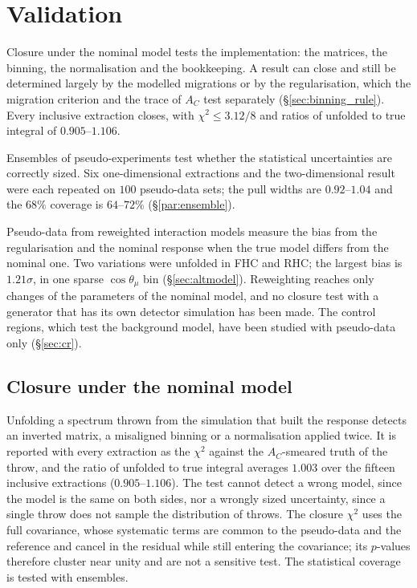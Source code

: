 \documentclass[11pt,a4paper]{article}
\begin{document}
\section{Validation}
\label{sec:validation}

Closure under the nominal model tests the implementation: the matrices, the binning, the
normalisation and the bookkeeping. A result can close and still be determined largely by the modelled
migrations or by the regularisation, which the migration criterion and the trace of $A_C$ test
separately (\S\ref{sec:binning_rule}). Every inclusive extraction closes, with $\chi^2\le3.12/8$ and
ratios of unfolded to true integral of $0.905$--$1.106$.

Ensembles of pseudo-experiments test whether the statistical uncertainties are correctly sized. Six
one-dimensional extractions and the two-dimensional result were each repeated on $100$ pseudo-data sets;
the pull widths are $0.92$--$1.04$ and the $68\%$ coverage is $64$--$72\%$ (\S\ref{par:ensemble}).

Pseudo-data from reweighted interaction models measure the bias from the regularisation and the nominal
response when the true model differs from the nominal one. Two variations were unfolded in FHC and
RHC; the largest bias is $1.21\sigma$, in one sparse $\cos\theta_\mu$ bin (\S\ref{sec:altmodel}).
Reweighting reaches only changes of the parameters of the nominal model, and no closure test with a
generator that has its own detector simulation has been made. The control regions, which test the
background model, have been studied with pseudo-data only (\S\ref{sec:cr}).

\subsection{Closure under the nominal model}

Unfolding a spectrum thrown from the simulation that built the response detects an inverted
matrix, a misaligned binning or a normalisation applied twice. It is reported with every
extraction as the $\chi^2$ against the $A_C$-smeared truth of the throw, and the ratio of unfolded
to true integral averages $1.003$ over the fifteen inclusive extractions ($0.905$--$1.106$). The
test cannot detect a wrong model, since the model is the same on both sides, nor a wrongly sized
uncertainty, since a single throw does not sample the distribution of throws. The closure $\chi^2$
uses the full covariance, whose systematic terms are common to the pseudo-data and the reference and
cancel in the residual while still entering the covariance; its $p$-values therefore cluster near
unity and are not a sensitive test. The statistical coverage is tested with ensembles.
\end{document}

